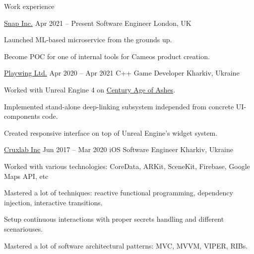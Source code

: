 \newenvironment{work}[5]{ %
    \begin{rSubsection}
        {\href{#2}{#1}}
        {#3}
        {#4}
        {#5}
}{
    \end{rSubsection}
}

\begin{cvsection}{Work experience}
\begin{work}
{Snap Inc.}
{https://snap.com}
{Apr 2021 -- Present}
{Software Engineer}
{London, UK}
	\item Launched ML-based microservice from the grounds up.
	\item Become POC for one of internal tools for Cameos product creation.
\end{work}

\begin{work}
{Playwing Ltd.}
{https://playwing.com}
{Apr 2020 -- Apr 2021}
{C++ Game Developer}
{Kharkiv, Ukraine}
	\item Worked with Unreal Engine 4 on \href{https://www.century-age-of-ashes.com/}{Century Age of Ashes}.
	\item Implemented stand-alone deep-linking subsystem independed from concrete UI-components code.
	\item Created responsive interface on top of Unreal Engine's widget system.
\end{work}

\begin{work}
{Cruxlab Inc}
{https://cruxlab.com/}
{Jun 2017 -- Mar 2020}
{iOS Software Engineer}
{Kharkiv, Ukraine}
	\item Worked with various technologies: CoreData, ARKit, SceneKit, Firebase, Google Maps API, etc
	\item Mastered a lot of techniques: reactive functional programming, dependency injection, interactive transitions.
	\item Setup continuous interactions with proper secrets handling and different scenariouses.
	\item Mastered a lot of software architectural patterns: MVC, MVVM, VIPER, RIBs.
\end{work}
\end{cvsection}
